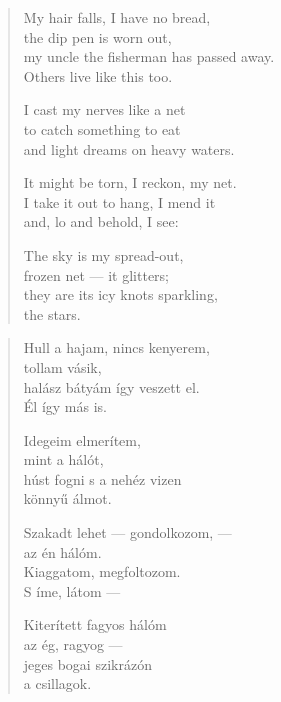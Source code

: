 \documentclass[11pt]{book}
\newcommand*{\centeredornament}{\centerline{\pgfornament[width=6cm]{88}}}
\begin{document}
\newpage

\vspace*{-15mm}
\centeredornament



\begin{verse}
  My hair falls, I have no bread, \\
  the dip pen is worn out, \\
  my uncle the fisherman has passed away. \\
  Others live like this too.

  I cast my nerves like a net \\
  to catch something to eat \\
  and light dreams on heavy waters.

  It might be torn, I reckon, my net. \\
  I take it out to hang, I mend it \\
  and, lo and behold, I see:

  The sky is my spread-out, \\
  frozen net --- it glitters; \\
  they are its icy knots sparkling, \\
  the stars.
\end{verse}

\newpage

\vspace*{-15mm}
\centeredornament



\begin{verse}
  Hull a hajam, nincs kenyerem, \\
  tollam vásik, \\
  halász bátyám így veszett el. \\
  Él így más is.

  Idegeim elmerítem, \\
  mint a hálót, \\
  húst fogni s a nehéz vizen \\
  könnyű álmot.

  Szakadt lehet --- gondolkozom, --- \\
  az én hálóm. \\
  Kiaggatom, megfoltozom. \\
  S íme, látom ---

  Kiterített fagyos hálóm \\
  az ég, ragyog --- \\
  jeges bogai szikrázón \\
  a csillagok.
\end{verse}
\end{document}

